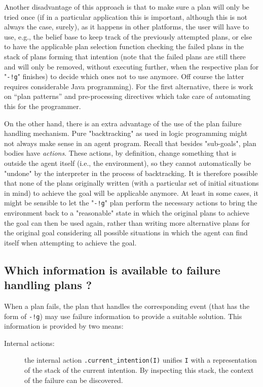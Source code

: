 \documentclass{article}
\newcommand{\jason}[0]{\htlink{\textit{Jason}}{http://jason.sf.net}\xspace}
\begin{document}
\begin{description}
Another disadvantage of this approach is that to make sure a plan will
only be tried once (if in a particular application this is important,
although this is not always the case, surely), as it happens in other
platforms, the user will have to use, e.g., the belief base to keep
track of the previously attempted plans, or else to have the
applicable plan selection function checking the failed plans in the
stack of plans forming that intention (note that the failed plans are
still there and will only be removed, without executing further, when
the respective plan for "\texttt{-!g}" finishes) to decide which ones
not to use anymore. Off course the latter requires considerable Java
programming). For the first alternative, there is work on ``plan
patterns'' and pre-processing directives which take care of automating
this for the programmer.

On the other hand, there is an extra advantage of the use of the
\jason plan failure handling mechanism. Pure "backtracking" as used in
logic programming might not always make sense in an agent program.
Recall that besides "sub-goals", plan bodies have \emph{actions}.
These actions, by definition, change something that is outside the
agent itself (i.e., the environment), so they cannot automatically be
"undone" by the interpreter in the process of backtracking. It is
therefore possible that none of the plans originally written (with a
particular set of initial situations in mind) to achieve the goal will
be applicable anymore. At least in some cases, it might be sensible to
let the "\texttt{-!g}" plan perform the necessary actions to bring the
environment back to a "reasonable" state in which the original plans
to achieve the goal can then be used again, rather than writing more
alternative plans for the original goal considering all possible
situations in which the agent can find itself when attempting to
achieve the goal.

\subsection{Which information is available to failure handling plans ?}

When a plan fails, the plan that handles the corresponding event (that
has the form of \texttt{-!g}) may use failure information to provide a
suitable solution. This information is provided by two means:
\begin{description}
\item[Internal actions:] the internal action
  \texttt{.current\_intention(I)} unifies \texttt{I} with a
  representation of the stack of the current intention. By inspecting
  this stack, the context of the failure can be discovered.


\end{description}
\end{description}
\end{document}

